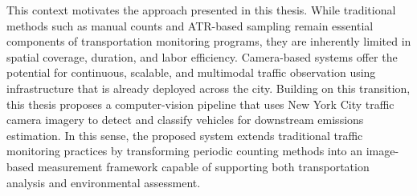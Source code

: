 This context motivates the approach presented in this thesis. While traditional 
methods such as manual counts and ATR-based sampling remain essential components 
of transportation monitoring programs, they are inherently limited in spatial 
coverage, duration, and labor efficiency. Camera-based systems offer the potential 
for continuous, scalable, and multimodal traffic observation using infrastructure
that is already deployed across the city. Building on this transition, this thesis 
proposes a computer-vision pipeline that uses New York City traffic camera imagery 
to detect and classify vehicles for downstream emissions estimation. In this sense,
the proposed system extends traditional traffic monitoring practices by transforming
periodic counting methods into an image-based measurement framework capable of 
supporting both transportation analysis and environmental assessment.

